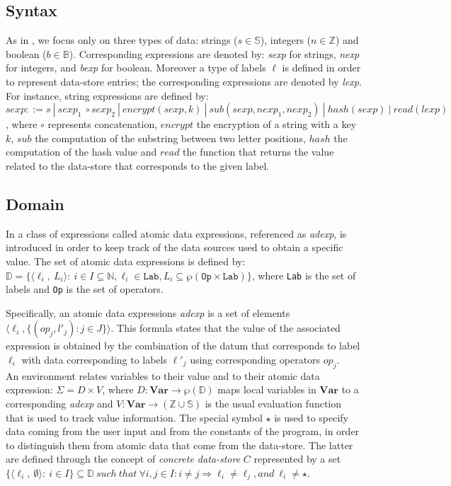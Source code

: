 \documentclass{llncs}
\begin{document}
\subsection{Syntax}
As in \cite{Cortesi15}, we focus only on three types of data: strings ($s \in \mathbb{S}$), integers ($n \in \mathbb{Z}$) and boolean ($b \in \mathbb{B}$). Corresponding expressions are denoted by: \emph{sexp} for strings, \emph{nexp} for integers, and \emph{bexp} for boolean. Moreover a type of labels $\ell$ is defined in order to represent data-store entries; the corresponding expressions are denoted by \emph{lexp}. 
For instance, string expressions are defined by: $sexp ::= s\ |\ sexp_{1}\ \circ  sexp_{2} \ |\   encrypt(sexp,k) \ |\  sub(sexp,nexp_1,nexp_2)\ |\ \allowbreak hash(sexp)\ |\ read(lexp)$, where $\circ$ represents concatenation, $encrypt$ the encryption of a string with a key $k$, $sub$ the computation of the substring between two letter positions, $hash$ the computation of the hash value and $read$ the function that returns the value related to the data-store that corresponds to the given label. 

\subsection{Domain}
In  \cite{Cortesi15} a class of expressions called atomic data expressions, referenced as \emph{adexp}, is introduced  in order to keep track of the data sources used to obtain a specific value. The set of atomic data expressions is defined by: $\mathbb{D}=\{\langle \ell_i,\ L_i\rangle :\ i \in I \subseteq \mathbb{N}, \ell_i \in \texttt{Lab}, L_i \subseteq \wp(\texttt{Op} \times \texttt{Lab})\} $, where \texttt{Lab} is the set of labels and \texttt{Op} is the set of operators. 

Specifically, an atomic data expressions \emph{adexp} is a set of elements $\langle \ell_i, \{(op_j,l'_j):j\in J\} \rangle$. This formula states that the value of the associated expression is obtained by the combination of the datum that corresponds to label $\ell_i$ with data corresponding to labels $\ell'_j$ using corresponding operators $op_j$.\\


An environment relates variables to their value and to their atomic data expression:   $\Sigma=D\times V$, where $D: \mathbf{Var} \longrightarrow \wp(\mathbb{D}) $ maps local variables in $\mathbf{Var}$ to a corresponding \emph{adexp} and $V: \mathbf{Var} \longrightarrow (\mathbb{Z}\cup\mathbb{S})$ is the usual evaluation function that is used to track value information. The special symbol $\star$ is used to specify data coming from the user input and from the constants of the program, in order to distinguish them from atomic data that come from the data-store. The latter are defined through the concept of \emph{concrete data-store} $C$ represented by a set $\{\langle \ell_i,\ \emptyset\rangle :\ i \in I\} \subseteq \mathbb{D}\ such\ that\ \forall i,j \in I:i\neq j \Rightarrow \ell_i\neq \ell_j, and\ \ell_i \neq \star $.\\ 
\end{document}
